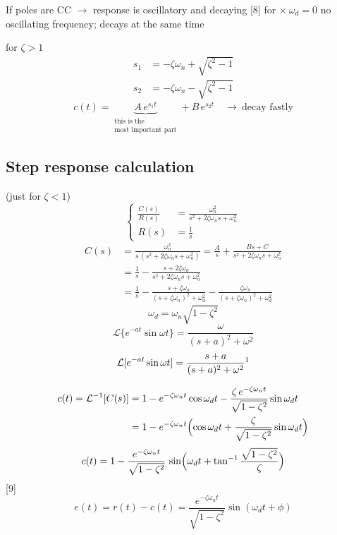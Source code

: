 \documentclass[11pt,a4paper]{article}
\begin{document}
If poles are CC $\to$ response is oscillatory and decaying
[8]
for $\times\ \omega_d=0$ \quad no oscillating frequency; decays at the same time

for $\zeta>1$
\begin{align*}
s_1&=-\zeta\omega_n+\sqrt{\zeta^2-1}\\
s_2&=-\zeta\omega_n-\sqrt{\zeta^2-1}
\end{align*}
\[ c(t)=\underbrace{A\,e^{s_1 t}}_{\substack{\text{this is the}\\\text{most important part}}}+B\,e^{s_2 t}\quad\to\ \text{decay fastly} \]

\subsection{Step response calculation}
(just for $\zeta<1$)
\[ \left\{\begin{aligned}\frac{C(s)}{R(s)}&=\frac{\omega_n^2}{s^2+2\zeta\omega_n s+\omega_n^2}\\ R(s)&=\frac{1}{s}\end{aligned}\right. \]
\begin{align*}
C(s)&=\frac{\omega_n^2}{s\,(s^2+2\zeta\omega_n s+\omega_n^2)}=\frac{A}{s}+\frac{Bs+C}{s^2+2\zeta\omega_n s+\omega_n^2}\\
&=\frac{1}{s}-\frac{s+2\zeta\omega_n}{s^2+2\zeta\omega_n s+\omega_n^2}\\
&=\frac{1}{s}-\frac{s+\zeta\omega_n}{(s+\zeta\omega_n)^2+\omega_d^2}-\frac{\zeta\omega_n}{(s+\zeta\omega_n)^2+\omega_d^2}
\end{align*}
\[ \omega_d=\omega_n\sqrt{1-\zeta^2} \]
\[ \mathcal{L}\{e^{-at}\sin\omega t\}=\frac{\omega}{(s+a)^2+\omega^2} \]
\[ \mathcal{L}[e^{-at}\sin\omega t]=\frac{s+a}{(s+a)^2+\omega^2}\footnotemark \]


\begin{align*}
c(t)=\mathcal{L}^{-1}[C(s)]&=1-e^{-\zeta\omega_n t}\cos\omega_d t-\frac{\zeta\,e^{-\zeta\omega_n t}}{\sqrt{1-\zeta^2}}\sin\omega_d t\\
&=1-e^{-\zeta\omega_n t}\Bigl(\cos\omega_d t+\frac{\zeta}{\sqrt{1-\zeta^2}}\sin\omega_d t\Bigr)
\end{align*}
\[ c(t)=1-\frac{e^{-\zeta\omega_n t}}{\sqrt{1-\zeta^2}}\,\sin\Bigl(\omega_d t+\tan^{-1}\frac{\sqrt{1-\zeta^2}}{\zeta}\Bigr) \]
[9]
\[ e(t)=r(t)-c(t)=\frac{e^{-\zeta\omega_n t}}{\sqrt{1-\zeta^2}}\sin(\omega_d t+\phi) \]
\end{document}
